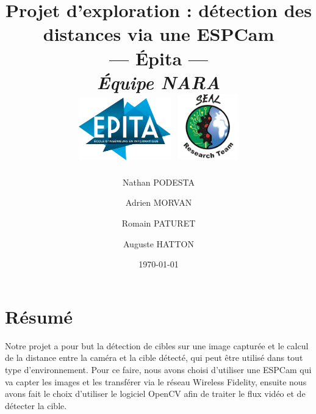 \documentclass[12pt, a4paper]{report}
\title{\textbf{Projet d'exploration : détection des distances via une ESPCam} \\ 
\Large{--- Épita --- \\ 
\textit{Équipe NARA}} \\ 
\vspace{1,5cm} 
\includegraphics[width=0.3\textwidth]{./img/logo_epita} \includegraphics[width=0.2\textwidth]{./img/logo_equipe_robotique_exploration} 
\vspace{1,5cm}}
\date{\today}
\author{Nathan PODESTA 
\and Adrien MORVAN 
\and Romain PATURET 
\and Auguste HATTON}
\begin{document}
	\maketitle
        \chapter*{Résumé}
Notre projet a pour but la détection de cibles sur une image capturée et le calcul de la distance entre la caméra et la cible détecté, qui peut être utilisé dans tout type d'environnement.
Pour ce faire, nous avons choisi d'utiliser une ESPCam qui va capter les images et les transférer via le réseau Wireless Fidelity, ensuite nous avons fait le choix d'utiliser le logiciel OpenCV afin de traiter le flux vidéo et de détecter la cible.
	
	\tableofcontents

	




			



	

	

\printglossaries
	




	
\end{document}
